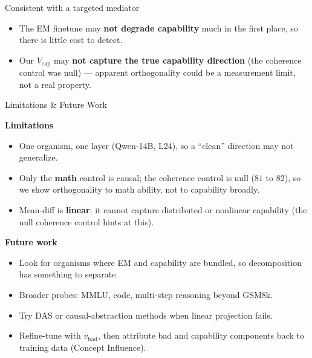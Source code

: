 \documentclass[final]{beamer}
\newcommand{\vbad}{v_{\mathrm{bad}}}
\newcommand{\Vcap}{V_{\mathrm{cap}}}
\newlength{\colwidth}
\begin{document}
\begin{frame}[t]
\begin{columns}[t]
\begin{column}{\colwidth}
\begin{alertblock}{Consistent with a targeted mediator}
    \begin{itemize}
      \item The EM finetune may \textbf{not degrade capability} much in the
        first place, so there is little cost to detect.
      \item Our $\Vcap$ may \textbf{not capture the true capability direction}
        (the coherence control was null) --- apparent orthogonality could be a
        measurement limit, not a real property.
    \end{itemize}

  \end{alertblock}

  \begin{block}{Limitations \& Future Work}
    \begin{minipage}[t]{0.48\linewidth}
      \vspace{0pt}
      \textbf{Limitations}
      \begin{itemize}
        \item One organism, one layer (Qwen-14B, L24), so a ``clean'' direction
          may not generalize.
        \item Only the \textbf{math} control is causal; the coherence control is
          null ($81$ to $82$), so we show orthogonality to math ability, not to
          capability broadly.
        \item Mean-diff is \textbf{linear}; it cannot capture distributed or
          nonlinear capability (the null coherence control hints at this).
      \end{itemize}
    \end{minipage}\hfill
    \begin{minipage}[t]{0.48\linewidth}
      \vspace{0pt}
      \textbf{Future work}
      \begin{itemize}
        \item Look for organisms where EM and capability are bundled, so
          decomposition has something to separate.
        \item Broader probes: MMLU, code, multi-step reasoning beyond GSM8k.
        \item Try DAS or causal-abstraction methods when linear projection fails.
        \item Refine-tune with $\vbad$, then attribute bad and capability
          components back to training data (Concept Influence).
      \end{itemize}
    \end{minipage}
  \end{block}


\end{column}
\end{columns}
\end{frame}
\end{document}
